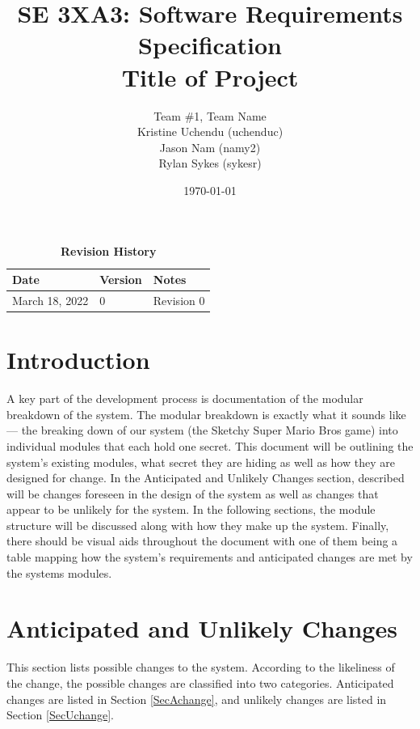 \documentclass[12pt, titlepage]{article}
\title{SE 3XA3: Software Requirements Specification\\Title of Project}
\author{Team \#1, Team Name
		\\ Kristine Uchendu (uchenduc)
		\\ Jason Nam (namy2)
		\\ Rylan Sykes (sykesr)
}
\date{\today}
\begin{document}
\maketitle

\tableofcontents
\listoftables
\listoffigures

\begin{table}[bp]
\caption{\bf Revision History}
\begin{tabularx}{\textwidth}{p{3cm}p{2cm}X}
\toprule {\bf Date} & {\bf Version} & {\bf Notes}\\
\midrule
March 18, 2022 & 0 & Revision 0\\
\bottomrule
\end{tabularx}
\end{table}

\newpage


\section{Introduction}

A key part of the development process is documentation of the modular breakdown of the system. The modular breakdown is exactly what it sounds like — the breaking down of our system (the Sketchy Super Mario Bros game) into individual modules that each hold one secret. This document will be outlining the system’s existing modules, what secret they are hiding as well as how they are designed for change. In the Anticipated and Unlikely Changes section, described will be changes foreseen in the design of the system as well as changes that appear to be unlikely for the system. In the following sections, the module structure will be discussed along with how they make up the system. Finally, there should be visual aids throughout the document with one of them being a table mapping how the system’s requirements and anticipated changes are met by the systems modules.

\section{Anticipated and Unlikely Changes} \label{SecChange}

This section lists possible changes to the system. According to the likeliness
of the change, the possible changes are classified into two
categories. Anticipated changes are listed in Section \ref{SecAchange}, and
unlikely changes are listed in Section \ref{SecUchange}.
\end{document}
